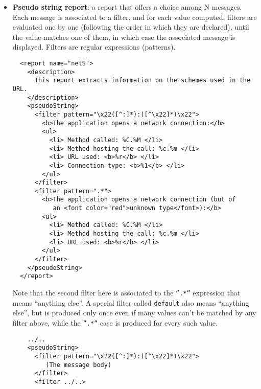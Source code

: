 \begin{itemize}
\item{\textbf{Pseudo string report}}: a report that offers a choice
  among N messages. Each message is associated to a filter, and for
  each value computed, filters are evaluated one by one (following the
  order in which they are declared), until the value matches one of
  them, in which case the associated message is displayed. Filters are
  regular expressions (patterns).
\begin{verbatim}
  <report name="netS">
    <description>
      This report extracts information on the schemes used in the URL.
    </description>
    <pseudoString>
      <filter pattern="\x22([^:]*):([^\x22]*)\x22">
        <b>The application opens a network connection:</b>
        <ul> 
          <li> Method called: %C.%M </li>
          <li> Method hosting the call: %c.%m </li>
          <li> URL used: <b>%r</b> </li>
          <li> Connection type: <b>%1</b> </li>
        </ul>
      </filter>
      <filter pattern=".*">
        <b>The application opens a network connection (but of
           an <font color="red">unknown type</font>):</b>
        <ul> 
          <li> Method called: %C.%M </li>
          <li> Method hosting the call: %c.%m </li>
          <li> URL used: <b>%r</b> </li>
        </ul>
      </filter>
    </pseudoString>
  </report>
\end{verbatim}
Note that the second filter here is associated to the \texttt{''.*''}
expression that means ``anything else''. A special filter called \texttt{default}
also means ``anything else'', but is produced only once even if many
values can't be matched by any filter above, while the \texttt{''.*''}
case is produced for every such value. 
\begin{verbatim}
    ../..
    <pseudoString>
      <filter pattern="\x22([^:]*):([^\x22]*)\x22">
         (The message body)
      </filter>
      <filter ../..>


\end{verbatim}
\end{itemize}
